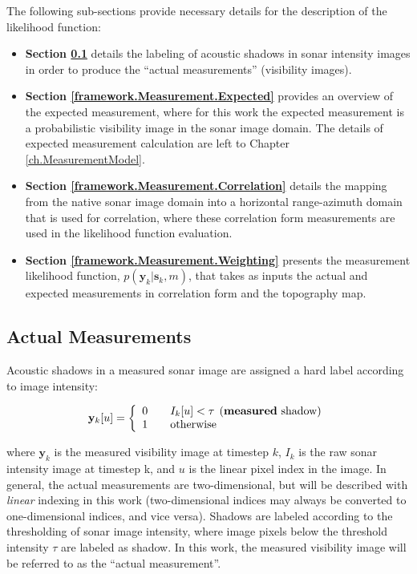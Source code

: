 The following sub-sections provide necessary details for the description of the likelihood function:

\begin{itemize}
\item \textbf{Section \ref{framework.Measurement.Measured}} details the labeling of acoustic shadows in sonar intensity images in order to produce the ``actual measurements'' (visibility images).

\item \textbf{Section \ref{framework.Measurement.Expected}} provides an overview of the expected measurement, where for this work the expected measurement is a probabilistic visibility image in the sonar image domain.
The details of expected measurement calculation are left to Chapter \ref{ch.MeasurementModel}.

\item \textbf{Section \ref{framework.Measurement.Correlation}} details the mapping from the native sonar image domain into a horizontal range-azimuth domain that is used for correlation, where these correlation form measurements are used in the likelihood function evaluation.

\item \textbf{Section \ref{framework.Measurement.Weighting}} presents the measurement likelihood  function, $p(\mathbf{y}_k | \mathbf{s}_k, m)$, that takes as inputs the actual and expected measurements in correlation form and the topography map.

\end{itemize}

\subsection{Actual Measurements}
\label{framework.Measurement.Measured}

Acoustic shadows in a measured sonar image are assigned a hard label according to image intensity:

\begin{equation}
\mathbf{y}_k[u] = \left\{ 
  \begin{array}{l l}
    0 & \quad I_k[u] < \tau \hspace{1ex} \text{(\textbf{measured} shadow)}\\
    1 & \quad \text{otherwise}
  \end{array} \right.
  \label{eq:shadowLabels}
\end{equation}

\noindent where $\mathbf{y}_k$ is the measured visibility image at timestep $k$, $I_k$ is the raw sonar intensity image at timestep k, and $u$ is the linear pixel index in the image.
In general, the actual measurements are two-dimensional, but will be described with \emph{linear} indexing in this work (two-dimensional indices may always be converted to one-dimensional indices, and vice versa).
Shadows are labeled according to the thresholding of sonar image intensity, where image pixels below the threshold intensity $\tau$ are labeled as shadow.  
In this work, the measured visibility image will be referred to as the ``actual measurement''.


